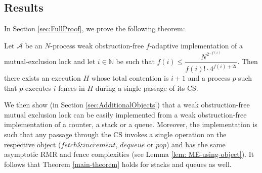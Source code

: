 \subsection{Results}

In Section \ref{sec:FullProof}, we prove the following theorem:

\begin{theorem} \label{main-theorem}
	Let $\mathcal{A}$ be an $N$-process weak obstruction-free $f$-adaptive implementation of a mutual-exclusion lock and let $i \in \mathbb{N}$ be such that $f(i) \leq \dfrac{N^{2^{-f(i)}}} {f(i)! \cdot 4^{f(i)+2i}}$.
	Then there exists an execution $H$  whose total contention is $i+1$ and a process $p$ such that $p$ executes $i$ fences in $H$ during a single passage of its CS.
\end{theorem}

We then show (in Section \ref{sec:AdditionalObjects}) that a weak obstruction-free mutual exclusion lock can be easily implemented from a weak obstruction-free implementation of a counter, a stack or a queue. Moreover, the implementation is such that any passage through the CS invokes a single operation on the respective object ($fetch \& increment$, $dequeue$ or $pop$) and has the same asymptotic RMR and fence complexities (see Lemma \ref{lem: ME-using-object}). It follows that Theorem \ref{main-theorem} holds for stacks and queues as well.

